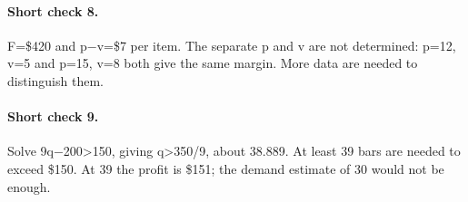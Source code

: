 \documentclass[11pt,letterpaper]{article}
\begin{document}
{\paragraph{Short check 8.}
F=\$420 and p$-$v=\$7 per item. The separate p and v are not determined: p=12, v=5 and p=15, v=8 both give the same margin. More data are needed to distinguish them.


\paragraph{Short check 9.}
Solve 9q$-$200\textgreater{}150, giving q\textgreater{}350/9, about 38.889. At least 39 bars are needed to exceed \$150. At 39 the profit is \$151; the demand estimate of 30 would not be enough.


\clearpage

}
\end{document}
